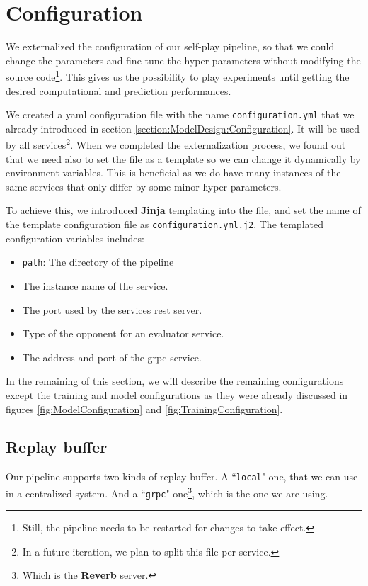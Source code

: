 \section{Configuration}
We externalized the configuration of our self-play pipeline, so that we could change the parameters and fine-tune the hyper-parameters without modifying the source code\footnote{Still, the pipeline needs to be restarted for changes to take effect.}. This gives us the possibility to play experiments until getting the desired computational and prediction performances.

We created a \acrshort{yaml} configuration file with the name \texttt{configuration.yml} that we already introduced in section \ref{section:ModelDesign:Configuration}. It will be used by all services\footnote{In a future iteration, we plan to split this file per service.}. When we completed the externalization process, we found out that we need also to set the file as a template so we can change it dynamically by environment variables. This is beneficial as we do have many instances of the same services that only differ by some minor hyper-parameters.

To achieve this, we introduced \textbf{Jinja} templating into the file, and set the name of the template configuration file as \texttt{configuration.yml.j2}. The templated configuration variables includes:
\begin{itemize}
	\item \texttt{path}: The directory of the pipeline
	\item The instance name of the service.
	\item The port used by the services \acrshort{rest} server.
	\item Type of the opponent for an evaluator service.
	\item The address and port of the \acrshort{grpc} service.
\end{itemize}

In the remaining of this section, we will describe the remaining configurations except the training and model configurations as they were already discussed in figures \ref{fig:ModelConfiguration} and \ref{fig:TrainingConfiguration}.

\subsection{Replay buffer}
Our pipeline supports two kinds of replay buffer. A ``\texttt{local}" one, that we can use in a centralized system. And a ``\texttt{grpc}" one\footnote{Which is the \textbf{Reverb} server.}, which is the one we are using.

